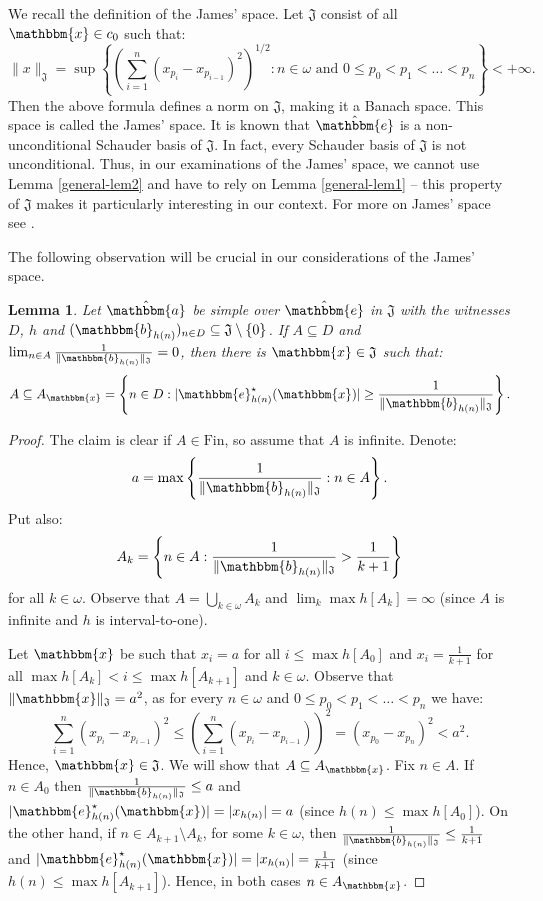 \documentclass{amsart}
\newcommand{\Fin}{\mathrm{Fin}}
\newcommand{\w}{\mathbbm}
\newtheorem{lemma}[theorem]{Lemma}
\begin{document}
We recall the definition of the James' space. Let $\mathfrak{J}$ consist of all $\w{x}\in c_0$ such that:
\[
\|x\|_{\mathfrak{J}}=\sup\left\{\left(\sum_{i=1}^n \left(x_{p_i}-x_{p_{i-1}}\right)^2\right)^{1/2}:n\in\omega\text{ and }0\leq p_0<p_1<\ldots<p_n\right\}<+\infty.
\]
Then the above formula defines a norm on $\mathfrak{J}$, making it a Banach space. This space is called the James' space. It is known that $\hat{\w{e}}$ is a non-unconditional Schauder basis of $\mathfrak{J}$. In fact, every Schauder basis of $\mathfrak{J}$ is not unconditional. Thus, in our examinations of the James' space, we cannot use Lemma \ref{general-lem2} and have to rely on Lemma \ref{general-lem1} -- this property of $\mathfrak{J}$ makes it particularly interesting in our context. For more on James' space see \cite{AK}.

The following observation will be crucial in our considerations of the James' space.

\begin{lemma}
\label{lem:James}
Let $\hat{\w{a}}$ be simple over $\hat{\w{e}}$ in $\mathfrak{J}$ with the witnesses $D$, $h$ and $(\w{b}_{h(n)})_{n\in D}\subseteq \mathfrak{J}\setminus\{0\}$. If $A\subseteq D$ and $\lim_{n\in A}\frac{1}{\|\w{b}_{h(n)}\|_{\mathfrak{J}}}=0$, then there is $\w{x}\in\mathfrak{J}$ such that: 
\[
A\subseteq A_{\w{x}}=\left\{n\in D: |\w{e}^\star_{h(n)}(\w{x})|\geq\frac{1}{\|\w{b}_{h(n)}\|_{\mathfrak{J}}}\right\}.
\]
\end{lemma}

\begin{proof}
The claim is clear if $A\in\Fin$, so assume that $A$ is infinite. Denote:
\[
a=\max\left\{\frac{1}{\|\w{b}_{h(n)}\|_{\mathfrak{J}}}:n\in A\right\}.
\]
Put also: 
\[
A_k=\left\{n\in A:\frac{1}{\|\w{b}_{h(n)}\|_{\mathfrak{J}}}>\frac{1}{k+1}\right\}
\]
for all $k\in\omega$. Observe that $A=\bigcup_{k\in\omega}A_k$ and $\lim_k \max h[A_{k}]=\infty$ (since $A$ is infinite and $h$ is interval-to-one). 

Let $\w{x}$ be such that $x_i=a$ for all $i\leq \max h[A_0]$ and $x_i=\frac{1}{k+1}$ for all $\max h[A_{k}]<i\leq \max h[A_{k+1}]$ and $k\in\omega$. Observe that $\|\w{x}\|_{\mathfrak{J}}=a^2$, as for every $n\in\omega$ and $0\leq p_0<p_1<\ldots<p_n$ we have:
\[
\sum_{i=1}^n \left(x_{p_i}-x_{p_{i-1}}\right)^2\leq\left(\sum_{i=1}^n\left(x_{p_i}-x_{p_{i-1}}\right)\right)^2=\left(x_{p_0}-x_{p_{n}}\right)^2<a^2.
\]
Hence, $\w{x}\in\mathfrak{J}$. We will show that $A\subseteq A_{\w{x}}$. Fix $n\in A$. If $n\in A_0$ then $\frac{1}{\|\w{b}_{h(n)}\|_{\mathfrak{J}}}\leq a$ and $|\w{e}^\star_{h(n)}(\w{x})|=|x_{h(n)}|=a$ (since $h(n)\leq\max h[A_0]$). On the other hand, if $n\in A_{k+1}\setminus A_k$, for some $k\in\omega$, then $\frac{1}{\|\w{b}_{h(n)}\|_{\mathfrak{J}}}\leq \frac{1}{k+1}$ and $|\w{e}^\star_{h(n)}(\w{x})|=|x_{h(n)}|=\frac{1}{k+1}$ (since $h(n)\leq\max h[A_{k+1}]$). Hence, in both cases $n\in A_{\w{x}}$.
\end{proof}
\end{document}
